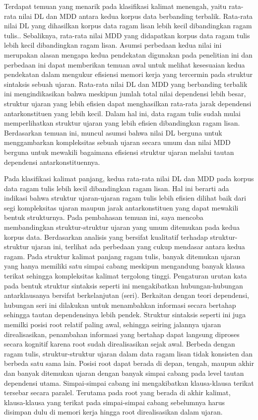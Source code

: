 Terdapat temuan yang menarik pada klasifikasi kalimat menengah, yaitu rata-rata nilai DL dan MDD antara kedua korpus data berbanding terbalik. Rata-rata nilai DL yang dihasilkan korpus data ragam lisan lebih kecil dibandingkan ragam tulis.. Sebaliknya, rata-rata nilai MDD yang didapatkan korpus data ragam tulis lebih kecil dibandingkan ragam lisan. Asumsi perbedaan kedua nilai ini merupakan alasan mengapa kedua pendekatan digunakan pada penelitian ini dan perbedaan ini dapat memberikan temuan awal untuk melihat kesesuaian kedua pendekatan dalam mengukur efisiensi memori kerja yang tercermin pada struktur sintaksis sebuah ujaran. Rata-rata nilai DL dan MDD yang berbanding terbalik ini mengindikasikan bahwa meskipun jumlah total nilai dependensi lebih besar, struktur ujaran yang lebih efisien dapat menghasilkan rata-rata jarak dependensi antarkonstituen yang lebih kecil. Dalam hal ini, data ragam tulis sudah mulai memperlihatkan struktur ujaran yang lebih efisien dibandingkan ragam lisan. Berdasarkan temuan ini, muncul asumsi bahwa nilai DL berguna untuk menggambarkan kompleksitas sebuah ujaran secara umum dan nilai MDD berguna untuk mewakili bagaimana efisiensi struktur ujaran melalui tautan dependensi antarkonstituennya.

Pada klasifikasi kalimat panjang, kedua rata-rata nilai DL dan MDD pada korpus data ragam tulis lebih kecil dibandingkan ragam lisan. Hal ini berarti ada indikasi bahwa struktur ujaran-ujaran ragam tulis lebih efisien dilihat baik dari segi kompleksitas ujaran maupun jarak antarkonstituen yang dapat mewakili bentuk strukturnya. Pada pembahasan temuan ini, saya mencoba membandingkan struktur-struktur ujaran yang umum ditemukan pada kedua korpus data. Berdasarkan analisis yang bersifat kualitatif terhadap struktur-struktur ujaran ini, terlihat ada perbedaan yang cukup mendasar antara kedua ragam. Pada struktur kalimat panjang ragam tulis, banyak ditemukan ujaran yang hanya memiliki satu simpai cabang meskipun mengandung banyak klausa terikat sehingga kompleksitas kalimat tergolong tinggi. Pengaturan urutan kata pada bentuk struktur sintaksis seperti ini mengakibatkan hubungan-hubungan antarklausanya bersifat berkelanjutan (seri). Berkaitan dengan teori dependensi, hubungan seri ini dilakukan untuk menambahkan informasi secara bertahap sehingga tautan dependensinya lebih pendek. Struktur sintaksis seperti ini juga memilki posisi root relatif paling awal, sehingga seiring jalannya ujaran direalisasikan, penambahan informasi yang bertahap dapat langsung diproses secara kognitif karena root sudah direalisasikan sejak awal. Berbeda dengan ragam tulis, struktur-struktur ujaran dalam data ragam lisan tidak konsisten dan berbeda satu sama lain. Posisi root dapat berada di depan, tengah, maupun akhir dan banyak ditemukan ujaran dengan banyak simpai cabang pada level tautan dependensi utama. Simpai-simpai cabang ini mengakibatkan klausa-klausa terikat tersebar secara paralel. Terutama pada root yang berada di akhir kalimat, klausa-klausa yang terikat pada simpai-simpai cabang sebelumnya harus disimpan dulu di memori kerja hingga root direalisasikan dalam ujaran. 


